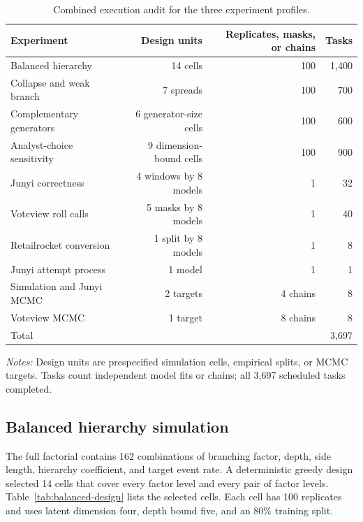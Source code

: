 \documentclass[
  12pt]{article}
\newcommand{\TableNote}[1]{%
  \par\vspace{0.35em}\noindent
  \begin{minipage}{0.96\linewidth}
    \footnotesize\setstretch{1.05}\raggedright
    \textit{Notes:} #1
  \end{minipage}%
  \par\vspace{0.6\baselineskip}%
}
\theoremstyle{definition}
\theoremstyle{plain}
\begin{document}
\begin{table}[H]
	\centering
	\footnotesize
	\caption{Combined execution audit for the three experiment profiles.}
	\label{tab:task-audit}
	\begin{tabular}{lrrr}
		\toprule
		Experiment & Design units & Replicates, masks, or chains & Tasks \\
		\midrule
		Balanced hierarchy & 14 cells & 100 & 1,400 \\
		Collapse and weak branch & 7 spreads & 100 & 700 \\
		Complementary generators & 6 generator-size cells & 100 & 600 \\
		Analyst-choice sensitivity & 9 dimension-bound cells & 100 & 900 \\
		Junyi correctness & 4 windows by 8 models & 1 & 32 \\
		Voteview roll calls & 5 masks by 8 models & 1 & 40 \\
		Retailrocket conversion & 1 split by 8 models & 1 & 8 \\
		Junyi attempt process & 1 model & 1 & 1 \\
		Simulation and Junyi MCMC & 2 targets & 4 chains & 8 \\
		Voteview MCMC & 1 target & 8 chains & 8 \\
		\midrule
		Total & & & 3,697 \\
		\bottomrule
	\end{tabular}
	\TableNote{Design units are prespecified simulation cells, empirical splits, or MCMC targets. Tasks count independent model fits or chains; all 3,697 scheduled tasks completed.}
\end{table}
\subsection{Balanced hierarchy simulation}
\label{supp:balanced}


The full factorial contains 162 combinations of branching factor, depth, side length, hierarchy coefficient, and target event rate. A deterministic greedy design selected 14 cells that cover every factor level and every pair of factor levels. Table~\ref{tab:balanced-design} lists the selected cells. Each cell has 100 replicates and uses latent dimension four, depth bound five, and an 80\% training split.
\end{document}
